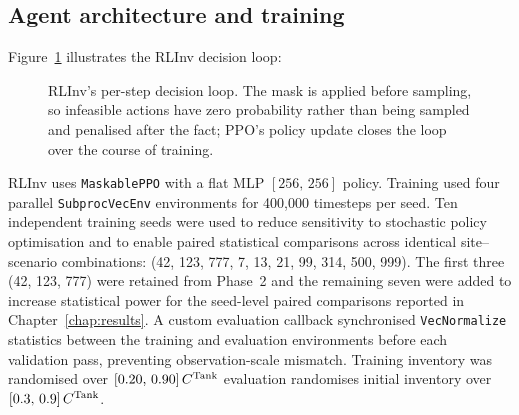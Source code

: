 \subsection{Agent architecture and training}

Figure~\ref{fig:rlinv_loop} illustrates the RLInv
decision loop: 

\begin{figure}[htbp]
\centering
{}
\caption{RLInv's per-step decision loop. The mask is applied before
sampling, so infeasible actions have zero probability rather than being
sampled and penalised after the fact; PPO's policy update closes the
loop over the course of training.}
\label{fig:rlinv_loop}
\end{figure}

RLInv uses \texttt{MaskablePPO} with a flat MLP $[256,\,256]$ policy.
Training used four parallel \texttt{SubprocVecEnv} environments for
400{,}000 timesteps per seed. Ten independent training seeds were used
to reduce sensitivity to stochastic policy optimisation and to enable
paired statistical comparisons across identical site--scenario
combinations: (42, 123, 777, 7, 13, 21, 99, 314, 500, 999). The first
three (42, 123, 777) were retained from Phase~2 and the
remaining seven were added to increase statistical power for the
seed-level paired comparisons reported in Chapter~\ref{chap:results}. A custom evaluation callback synchronised
\texttt{VecNormalize} statistics between the training and evaluation
environments before each validation pass, preventing observation-scale
mismatch. Training inventory was randomised over $[0.20,\,0.90]\,C^{\mathrm{Tank}}$
evaluation randomises initial inventory over $[0.3,\,0.9]\,C^{\mathrm{Tank}}$.

